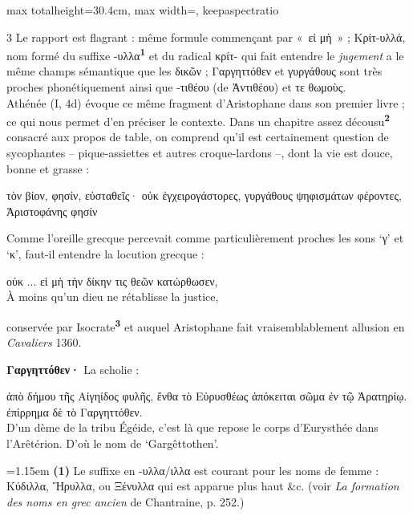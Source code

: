 \documentclass[11pt,twoside]{book}
\newcommand{\italique}[1]{\textit{#1}}
\newcommand{\citComm}[1]{\begin{quoting}[vskip=0.4pt,leftmargin=0.7em,rightmargin=0.2em]#1\end{quoting}}
\newcommand{\marqueur}[1]{\textsuperscript{\color{rubricRed}\textbf{#1}}}
\begin{document}
\begin{adjustbox}{max totalheight=30.4cm, max width=\textwidth, keepaspectratio}
\begin{minipage}{\textwidth}
{\begin{multicols}{3}
\noindent Le rapport est flagrant : même formule commençant par «~εἰ μὴ~» ; Κρίτ-υλλά, nom formé du suffixe -υλλα\marqueur{1} et du radical κρίτ- qui fait entendre le \italique{jugement} a le même champs sémantique que les δικῶν ; Γαργηττόθεν et γυργάθους sont très proches phonétiquement ainsi que -τιθέου (de Ἀντιθέου) et τε θωμοὺς.\\ Athénée (I, 4d) évoque ce même fragment d'Aristophane dans son premier livre ; ce qui nous permet d'en préciser le contexte. Dans un chapitre assez décousu\marqueur{2} consacré aux propos de table, on comprend qu'il est certainement question de sycophantes -- pique-assiettes et autres croque-lardons --, dont la vie est douce, bonne et grasse :
\citComm{τὸν βίον, φησίν, εὐσταθεῖς· οὐκ ἐγχειρογάστορες, γυργάθους ψηφισμάτων φέροντες, Ἀριστοφάνης φησίν}
\par\vspace{1.5pt}
\noindent Comme l'oreille grecque percevait comme particulièrement proches les sons `γ' et `κ', faut-il entendre la locution grecque :
\citComm{οὐκ ... εἰ μὴ τὴν δίκην τις θεῶν κατώρθωσεν,\\
À moins qu'un dieu ne rétablisse la justice,}
\par\vspace{1.5pt}
\noindent conservée par Isocrate\marqueur{3} et auquel Aristophane fait vraisemblablement allusion en \italique{Cavaliers} 1360.
\par\vspace{1.5pt}
 \textbf{Γαργηττόθεν·} La scholie :
\citComm{ἀπὸ δήμου τῆς Αἰγηίδος φυλῆς, ἔνθα τὸ Εὐρυσθέως ἀπόκειται σῶμα ἐν τῷ Ἀρατηρίῳ. ἐπίρρημα δὲ τὸ Γαργηττόθεν.\\
D'un dème de la tribu Égéide, c'est là que repose le corps d'Eurysthée dans l'Arêtérion. D'où le nom de `Gargêttothen'.}
\par\vspace{1.5pt}
\par\vspace{1.2pt}\par\nopagebreak\vspace{1pt}\noindent\hangindent=1.15em {\color{sepiaNote}\textbf{(1)}} Le suffixe en -υλλα/ιλλα est courant pour les noms de femme : Κύδιλλα, Ἥρυλλα, ou Ξένυλλα qui est apparue plus haut \&c. (voir \italique{La formation des noms en grec ancien} de Chantraine, p. 252.)
\par\vspace{1.5pt}

\end{multicols}}
\end{minipage}
\end{adjustbox}
\end{document}
